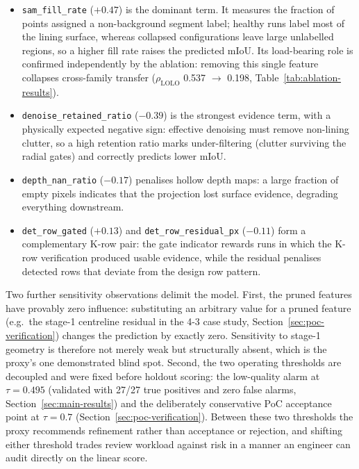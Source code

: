 \documentclass[a4paper,fleqn]{cas-dc}
\begin{document}
\begin{itemize}
\item \texttt{sam\_fill\_rate} ($+0.47$) is the dominant term. It measures the
fraction of points assigned a non-background segment label; healthy runs
label most of the lining surface, whereas collapsed configurations leave
large unlabelled regions, so a higher fill rate raises the predicted mIoU.
Its load-bearing role is confirmed independently by the ablation: removing
this single feature collapses cross-family transfer
($\rho_{\text{LOLO}}$ 0.537 $\rightarrow$ 0.198, Table~\ref{tab:ablation-results}).
\item \texttt{denoise\_retained\_ratio} ($-0.39$) is the strongest evidence
term, with a physically expected negative sign: effective denoising must
remove non-lining clutter, so a high retention ratio marks under-filtering
(clutter surviving the radial gates) and correctly predicts lower mIoU.
\item \texttt{depth\_nan\_ratio} ($-0.17$) penalises hollow depth maps: a
large fraction of empty pixels indicates that the projection lost surface
evidence, degrading everything downstream.
\item \texttt{det\_row\_gated} ($+0.13$) and \texttt{det\_row\_residual\_px}
($-0.11$) form a complementary K-row pair: the gate indicator rewards runs
in which the K-row verification produced usable evidence, while the residual
penalises detected rows that deviate from the design row pattern.
\end{itemize}

Two further sensitivity observations delimit the model. First, the pruned
features have provably zero influence: substituting an arbitrary value for a
pruned feature (e.g.\ the stage-1 centreline residual in the 4-3 case study,
Section~\ref{sec:poc-verification}) changes the prediction by exactly zero.
Sensitivity to stage-1 geometry is therefore not merely weak but structurally
absent, which is the proxy's one demonstrated blind spot. Second, the two
operating thresholds are decoupled and were fixed before holdout scoring: the
low-quality alarm at $\tau = 0.495$ (validated with 27/27 true positives and
zero false alarms, Section~\ref{sec:main-results}) and the deliberately
conservative PoC acceptance point at $\tau = 0.7$
(Section~\ref{sec:poc-verification}). Between these two thresholds the proxy
recommends refinement rather than acceptance or rejection, and shifting either
threshold trades review workload against risk in a manner an engineer can
audit directly on the linear score.
\end{document}
